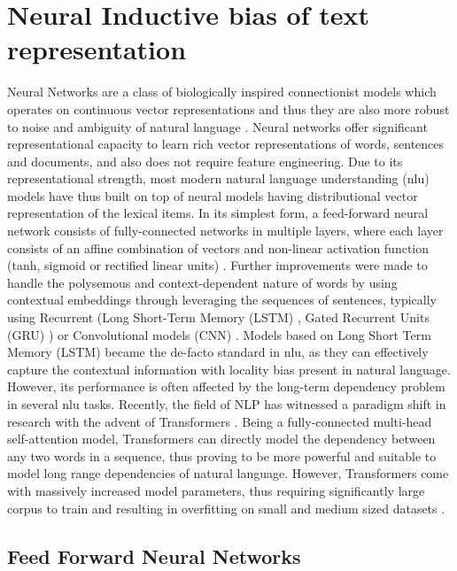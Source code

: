 \documentclass[letterpaper, 12pt]{report}
\begin{document}
\section{Neural Inductive bias of text representation}
\label{sec:bg_neural_nets}

Neural Networks are a class of biologically inspired connectionist models which operates on continuous vector representations and thus they are also more robust to noise and ambiguity of natural language \citep{wang2016machine,goodfellow2016deep}. Neural networks offer significant representational capacity to learn rich vector representations of words, sentences and documents, and also does not require feature engineering.
Due to its representational strength, most modern natural language understanding (\acrshort{nlu}) models have thus built on top of neural models having distributional vector representation of the lexical items.
In its simplest form, a feed-forward neural network consists of fully-connected networks in multiple layers, where each layer consists of an affine combination of vectors and non-linear activation function (tanh, sigmoid or rectified linear units) \citep{rosenblatt1958perceptron,rumelhart1986learning,hinton2006fast,bengio2006greedy}.
Further improvements were made to handle the polysemous and context-dependent nature of words by using contextual embeddings through leveraging the sequences of sentences, typically using Recurrent (Long Short-Term Memory (LSTM) \citep{hochreiter1997long}, Gated Recurrent Units (GRU) \citep{cho2014learning}) or Convolutional models (CNN) \citep{kim-2014-convolutional}. Models based on Long Short Term Memory (LSTM) became the de-facto standard in \acrshort{nlu}, as they can effectively capture the contextual information with locality bias present in natural language. However, its performance is often affected by the long-term dependency problem in several \acrshort{nlu} tasks.
Recently, the field of NLP has witnessed a paradigm shift in research with the advent of Transformers \citep{vaswani-etal-2017-attention}. Being a fully-connected multi-head self-attention model, Transformers can directly model the dependency between any two words in a sequence, thus proving to be more powerful and suitable to model long range dependencies of natural language. However, Transformers come with massively increased model parameters, thus requiring significantly large corpus to train and resulting in overfitting on small and medium sized datasets \citep{radford2018improving}.


\subsection{Feed Forward Neural Networks}
\label{sec:bg_ffn}
\end{document}
